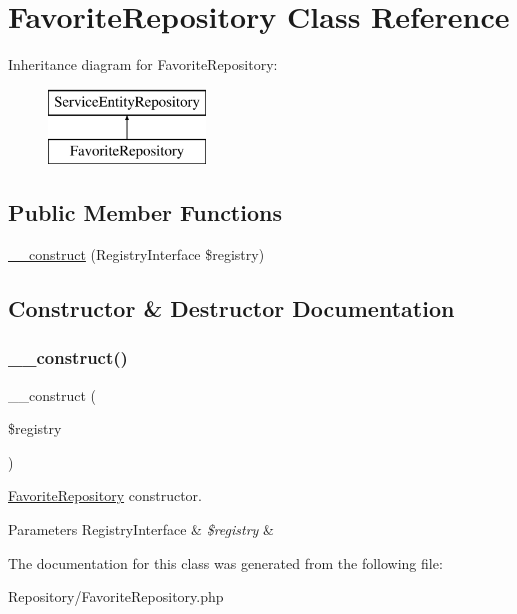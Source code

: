\hypertarget{class_app_1_1_repository_1_1_favorite_repository}{}\section{Favorite\+Repository Class Reference}
\label{class_app_1_1_repository_1_1_favorite_repository}
Inheritance diagram for Favorite\+Repository\+:\begin{figure}[H]
\begin{center}
\leavevmode
\includegraphics[height=2.000000cm]{class_app_1_1_repository_1_1_favorite_repository}
\end{center}
\end{figure}
\subsection*{Public Member Functions}
\begin{DoxyCompactItemize}
\item 
\mbox{\hyperlink{class_app_1_1_repository_1_1_favorite_repository_aadca7edd263e228921a1860bb6b9c252}{\+\_\+\+\_\+construct}} (Registry\+Interface \$registry)
\end{DoxyCompactItemize}


\subsection{Constructor \& Destructor Documentation}
\mbox{\label{class_app_1_1_repository_1_1_favorite_repository_aadca7edd263e228921a1860bb6b9c252}} 
\subsubsection{\texorpdfstring{\_\_construct()}{\_\_construct()}}
{\footnotesize\ttfamily \+\_\+\+\_\+construct (\begin{DoxyParamCaption}\item[{Registry\+Interface}]{\$registry }\end{DoxyParamCaption})}

\mbox{\hyperlink{class_app_1_1_repository_1_1_favorite_repository}{Favorite\+Repository}} constructor. 
\begin{DoxyParams}[1]{Parameters}
Registry\+Interface & {\em \$registry} & \\
\hline
\end{DoxyParams}


The documentation for this class was generated from the following file\+:\begin{DoxyCompactItemize}
\item 
Repository/Favorite\+Repository.\+php\end{DoxyCompactItemize}
